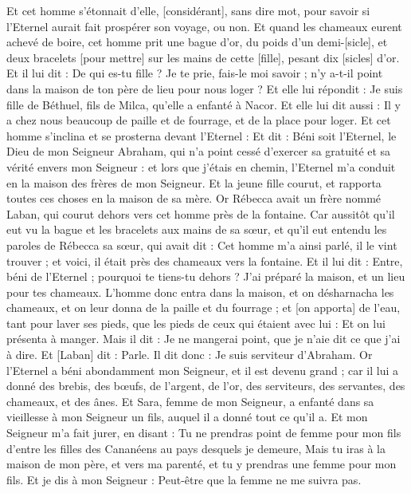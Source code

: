 \begin{multicols}{2}
Et cet homme s'étonnait d'elle, [considérant], sans dire mot, pour savoir si l'Eternel aurait fait prospérer son voyage, ou non.
Et quand les chameaux eurent achevé de boire, cet homme prit une bague d'or, du poids d'un demi-[sicle], et deux bracelets [pour mettre] sur les mains de cette [fille], pesant dix [sicles] d'or.
Et il lui dit : De qui es-tu fille ? Je te prie, fais-le moi savoir ; n'y a-t-il point dans la maison de ton père de lieu pour nous loger ?
Et elle lui répondit : Je suis fille de Béthuel, fils de Milca, qu'elle a enfanté à Nacor.
Et elle lui dit aussi : Il y a chez nous beaucoup de paille et de fourrage, et de la place pour loger.
Et cet homme s'inclina et se prosterna devant l'Eternel :
Et dit : Béni soit l'Eternel, le Dieu de mon Seigneur Abraham, qui n'a point cessé d'exercer sa gratuité et sa vérité envers mon Seigneur : et lors que j'étais en chemin, l'Eternel m'a conduit en la maison des frères de mon Seigneur.
Et la jeune fille courut, et rapporta toutes ces choses en la maison de sa mère.
Or Rébecca avait un frère nommé Laban, qui courut dehors vers cet homme près de la fontaine.
Car aussitôt qu'il eut vu la bague et les bracelets aux mains de sa sœur, et qu'il eut entendu les paroles de Rébecca sa sœur, qui avait dit : Cet homme m'a ainsi parlé, il le vint trouver ; et voici, il était près des chameaux vers la fontaine.
Et il lui dit : Entre, béni de l'Eternel ; pourquoi te tiens-tu dehors ? J'ai préparé la maison, et un lieu pour tes chameaux.
L'homme donc entra dans la maison, et on désharnacha les chameaux, et on leur donna de la paille et du fourrage ; et [on apporta] de l'eau, tant pour laver ses pieds, que les pieds de ceux qui étaient avec lui :
Et on lui présenta à manger. Mais il dit : Je ne mangerai point, que je n'aie dit ce que j'ai à dire. Et [Laban] dit : Parle.
Il dit donc : Je suis serviteur d'Abraham.
Or l'Eternel a béni abondamment mon Seigneur, et il est devenu grand ; car il lui a donné des brebis, des bœufs, de l'argent, de l'or, des serviteurs, des servantes, des chameaux, et des ânes.
Et Sara, femme de mon Seigneur, a enfanté dans sa vieillesse à mon Seigneur un fils, auquel il a donné tout ce qu'il a.
Et mon Seigneur m'a fait jurer, en disant : Tu ne prendras point de femme pour mon fils d'entre les filles des Cananéens au pays desquels je demeure,
Mais tu iras à la maison de mon père, et vers ma parenté, et tu y prendras une femme pour mon fils.
Et je dis à mon Seigneur : Peut-être que la femme ne me suivra pas.

\end{multicols}

